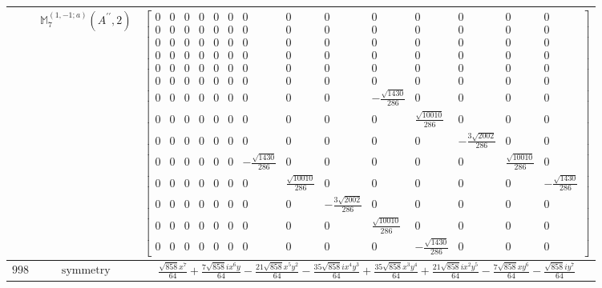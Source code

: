 \documentclass[fleqn,8pt,landscape]{jsarticle}
\begin{document}
\begin{longtable}{ccc}
$  $ & $ \mathbb{M}_{7}^{(1,-1;a)}(A^{\prime\prime},2) $ & $ \begin{bmatrix} 0 & 0 & 0 & 0 & 0 & 0 & 0 & 0 & 0 & 0 & 0 & 0 & 0 & 0 \\ 0 & 0 & 0 & 0 & 0 & 0 & 0 & 0 & 0 & 0 & 0 & 0 & 0 & 0 \\ 0 & 0 & 0 & 0 & 0 & 0 & 0 & 0 & 0 & 0 & 0 & 0 & 0 & 0 \\ 0 & 0 & 0 & 0 & 0 & 0 & 0 & 0 & 0 & 0 & 0 & 0 & 0 & 0 \\ 0 & 0 & 0 & 0 & 0 & 0 & 0 & 0 & 0 & 0 & 0 & 0 & 0 & 0 \\ 0 & 0 & 0 & 0 & 0 & 0 & 0 & 0 & 0 & 0 & 0 & 0 & 0 & 0 \\ 0 & 0 & 0 & 0 & 0 & 0 & 0 & 0 & 0 & - \frac{\sqrt{1430}}{286} & 0 & 0 & 0 & 0 \\ 0 & 0 & 0 & 0 & 0 & 0 & 0 & 0 & 0 & 0 & \frac{\sqrt{10010}}{286} & 0 & 0 & 0 \\ 0 & 0 & 0 & 0 & 0 & 0 & 0 & 0 & 0 & 0 & 0 & - \frac{3 \sqrt{2002}}{286} & 0 & 0 \\ 0 & 0 & 0 & 0 & 0 & 0 & - \frac{\sqrt{1430}}{286} & 0 & 0 & 0 & 0 & 0 & \frac{\sqrt{10010}}{286} & 0 \\ 0 & 0 & 0 & 0 & 0 & 0 & 0 & \frac{\sqrt{10010}}{286} & 0 & 0 & 0 & 0 & 0 & - \frac{\sqrt{1430}}{286} \\ 0 & 0 & 0 & 0 & 0 & 0 & 0 & 0 & - \frac{3 \sqrt{2002}}{286} & 0 & 0 & 0 & 0 & 0 \\ 0 & 0 & 0 & 0 & 0 & 0 & 0 & 0 & 0 & \frac{\sqrt{10010}}{286} & 0 & 0 & 0 & 0 \\ 0 & 0 & 0 & 0 & 0 & 0 & 0 & 0 & 0 & 0 & - \frac{\sqrt{1430}}{286} & 0 & 0 & 0 \end{bmatrix} $ \\ \hline
$ 998 $ & $ \text{symmetry} $ & $ \frac{\sqrt{858} x^{7}}{64} + \frac{7 \sqrt{858} i x^{6} y}{64} - \frac{21 \sqrt{858} x^{5} y^{2}}{64} - \frac{35 \sqrt{858} i x^{4} y^{3}}{64} + \frac{35 \sqrt{858} x^{3} y^{4}}{64} + \frac{21 \sqrt{858} i x^{2} y^{5}}{64} - \frac{7 \sqrt{858} x y^{6}}{64} - \frac{\sqrt{858} i y^{7}}{64} $ \\

\end{longtable}
\end{document}
